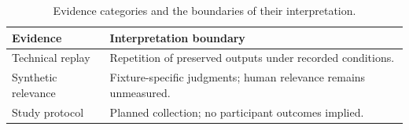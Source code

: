 \begin{table}[t]
  \caption{Evidence categories and the boundaries of their interpretation.}
  \label{tab:evidence-boundaries}
  \centering
  \begin{tabularx}{\columnwidth}{@{}lX@{}}
    \toprule
    Evidence & Interpretation boundary \\
    \midrule
    Technical replay & Repetition of preserved outputs under recorded conditions. \\
    Synthetic relevance & Fixture-specific judgments; human relevance remains unmeasured. \\
    Study protocol & Planned collection; no participant outcomes implied. \\
    \bottomrule
  \end{tabularx}
\end{table}
